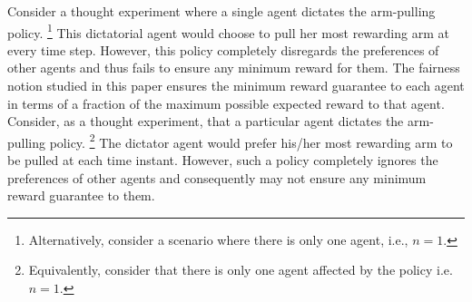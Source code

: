 




 Consider a thought experiment where a single agent dictates the arm-pulling policy. \footnote{Alternatively, consider a scenario where there is only one agent, i.e., \( n = 1 \).}  This dictatorial agent would choose to pull her most rewarding arm at every time step. However, this policy completely disregards the preferences of other agents and thus fails to ensure any minimum reward for them. 
\iffalse 
The fairness notion studied in this paper ensures the minimum reward guarantee to each agent in terms of a fraction of the maximum possible expected reward to that agent. Consider, as a thought experiment,  that a particular agent dictates the arm-pulling policy. \footnote{Equivalently, consider that there is only one agent affected by the policy i.e. $n =1$.}  The dictator agent would prefer his/her most rewarding arm to be pulled at each time instant.  However, such a policy completely ignores the preferences of other agents and consequently may not ensure any minimum reward guarantee to them. 


